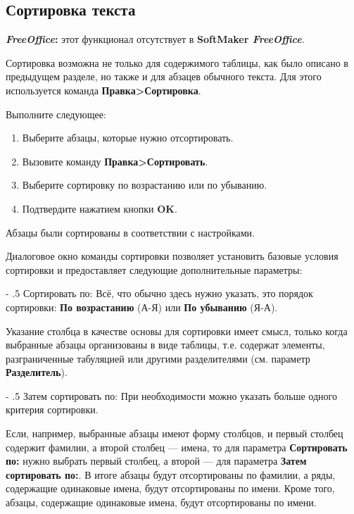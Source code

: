 ﻿\documentclass[a4paper,10pt]{article}
\makeatletter
\renewcommand\paragraph{%
   \@startsection{paragraph}{4}{0mm}%
      {-\baselineskip}%
      {.5\baselineskip}%
      {\normalfont\normalsize\bfseries}}
\makeatother
\begin{document}
\subsection{Сортировка текста} \label{sec:сортировкатекста}
\begin{mdframed}[backgroundcolor=pink!50]
\textbf{\textit{FreeOffice}:} этот функционал отсутствует в \textbf{SoftMaker \textit{FreeOffice}}.
\end{mdframed}

Сортировка возможна не только для содержимого таблицы, как было описано в предыдущем разделе, но также и для абзацев обычного текста. Для этого используется команда \textbf{Правка>Сортировка}.

Выполните следующее:
\begin{enumerate}
 \item Выберите абзацы, которые нужно отсортировать.
 \item Вызовите команду \textbf{Правка>Сортировать}.
 \item Выберите сортировку по возрастанию или по убыванию.
 \item Подтвердите нажатием кнопки \textbf{OK}.
\end{enumerate}

Абзацы были сортированы в соответствии с настройками.

Диалоговое окно команды сортировки позволяет установить базовые условия сортировки и предоставляет следующие дополнительные параметры:

\paragraph{Сортировать по:}
Всё, что обычно здесь нужно указать, это порядок сортировки: \textbf{По возрастанию} (А-Я) или \textbf{По убыванию} (Я-А).

Указание столбца в качестве основы для сортировки имеет смысл, только когда выбранные абзацы организованы в виде таблицы, т.е. содержат элементы, разграниченные табуляцией или другими разделителями (см. параметр \textbf{Разделитель}).

\paragraph{Затем сортировать по:}
При необходимости можно указать больше одного критерия сортировки.

Если, например, выбранные абзацы имеют форму столбцов, и первый столбец содержит фамилии, а второй столбец — имена, то для параметра \textbf{Сортировать по:} нужно выбрать первый столбец, а второй — для параметра \textbf{Затем сортировать по:}. В итоге абзацы будут отсортированы по фамилии, а ряды, содержащие одинаковые имена, будут отсортированы по имени. Кроме того, абзацы, содержащие одинаковые имена, будут отсортированы по имени.
\end{document}
